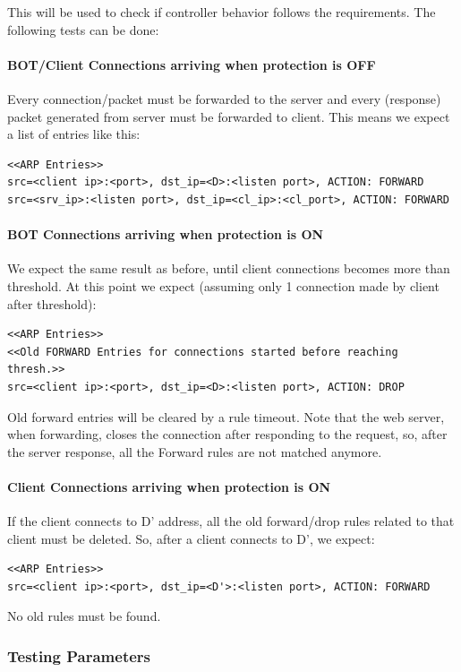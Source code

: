 This will be used to check if controller behavior follows the requirements. The following tests can be done:

\paragraph{BOT/Client Connections arriving when protection is OFF}
Every connection/packet must be forwarded to the server and every (response) packet generated from server must be forwarded to client. This means we expect a list of entries like this:
\begin{lstlisting}
<<ARP Entries>>
src=<client ip>:<port>, dst_ip=<D>:<listen port>, ACTION: FORWARD
src=<srv_ip>:<listen port>, dst_ip=<cl_ip>:<cl_port>, ACTION: FORWARD
\end{lstlisting}

\paragraph{BOT Connections arriving when protection is ON}
We expect the same result as before, until client connections becomes more than threshold. At this point we expect (assuming only 1 connection made by client after threshold):
\begin{lstlisting}
<<ARP Entries>>
<<Old FORWARD Entries for connections started before reaching thresh.>>
src=<client ip>:<port>, dst_ip=<D>:<listen port>, ACTION: DROP
\end{lstlisting}
Old forward entries will be cleared by a rule timeout. Note that the web server, when forwarding, closes the connection after responding to the request, so, after the server response, all the Forward rules are not matched anymore.

\paragraph{Client Connections arriving when protection is ON}
If the client connects to D' address, all the old forward/drop rules related to that client must be deleted. So, after a client connects to D', we expect:
\begin{lstlisting}
<<ARP Entries>>
src=<client ip>:<port>, dst_ip=<D'>:<listen port>, ACTION: FORWARD
\end{lstlisting}
No old rules must be found.
\subsubsection{Testing Parameters}

